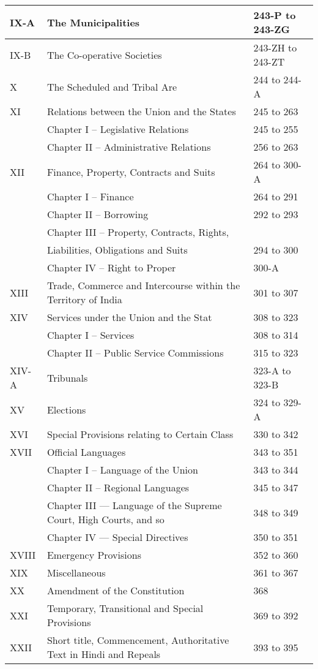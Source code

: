 \begin{longtable}[c]{@{}|p{1cm}|p{7cm}|p{4cm}|@{}}
  IX-A & The Municipalities & 243-P to 243-ZG \\\midrule
  IX-B & The Co-operative Societies & 243-ZH to 243-ZT \\\midrule
  X & The Scheduled and Tribal Are & 244 to 244-A \\\midrule
  XI & Relations between the Union and the States & 245 to 263 \\
  & Chapter I – Legislative Relations & 245 to 255 \\
  & Chapter II – Administrative Relations & 256 to 263 \\\midrule
  XII & Finance, Property, Contracts and Suits & 264 to 300-A \\*\midrule
  & Chapter I – Finance & 264 to 291 \\
  & Chapter II – Borrowing & 292 to 293 \\
  & Chapter III – Property, Contracts, Rights, &  \\
  & Liabilities, Obligations and Suits & 294 to 300 \\
  & Chapter IV – Right to Proper & 300-A \\ \midrule
  XIII & Trade, Commerce and Intercourse within the Territory of India & 301 to 307 \\\midrule
  XIV & Services under the Union and the Stat & 308 to 323 \\
  & Chapter I – Services & 308 to 314 \\
  & Chapter II – Public Service Commissions & 315 to 323 \\\midrule
  XIV-A & Tribunals & 323-A to 323-B \\\midrule
  XV & Elections & 324 to 329-A \\\midrule
  XVI & Special Provisions relating to Certain Class & 330 to 342 \\\midrule
  XVII & Official Languages & 343 to 351 \\
  & Chapter I – Language of the Union & 343 to 344 \\
  & Chapter II – Regional Languages & 345 to 347 \\
  & Chapter III — Language of the Supreme Court, High Courts, and so & 348 to 349 \\
  & Chapter IV — Special Directives & 350 to 351 \\\midrule
  XVIII & Emergency Provisions & 352 to 360 \\\midrule
  XIX & Miscellaneous & 361 to 367 \\\midrule
  XX & Amendment of the Constitution & 368 \\\midrule
  XXI & Temporary, Transitional and Special Provisions & 369 to 392 \\\midrule
  XXII & Short title, Commencement, Authoritative Text in Hindi and Repeals & 393 to 395\\\bottomrule
\end{longtable}

